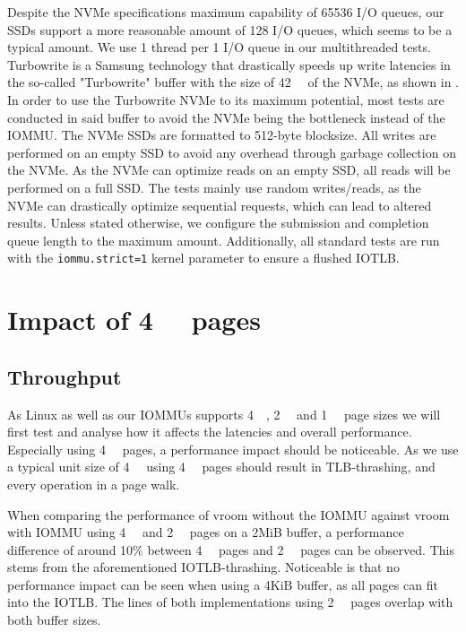 Despite the NVMe specifications maximum capability of 65536 I/O queues, our SSDs support a more reasonable amount of 128 I/O queues, which seems to be a typical amount.
We use 1 thread per 1 I/O queue in our multithreaded tests. Turbowrite is a Samsung technology that drastically speeds up write latencies in the so-called "Turbowrite" buffer with the size of \qty{42}{\giga\byte} of the NVMe, as shown in \cite{vroom}. In order to use the Turbowrite NVMe to its maximum potential, most tests are conducted in said buffer to avoid the NVMe being the bottleneck instead of the IOMMU.
The NVMe SSDs are formatted to 512-byte blocksize. All writes are performed on an empty SSD to avoid any overhead through garbage collection on the NVMe. As the NVMe can optimize reads on an empty SSD, all reads will be performed on a full SSD. The tests mainly use random writes/reads, as the NVMe can drastically optimize sequential requests, which can lead to altered results.
Unless stated otherwise, we configure the submission and completion queue length to the maximum amount.
Additionally, all standard tests are run with the \texttt{iommu.strict=1} kernel parameter to ensure a flushed IOTLB.

\section{Impact of \qty{4}{\kibi\byte} pages}
\subsection{Throughput}
As Linux as well as our IOMMUs supports \qty{4}{\kibi\byte}, \qty{2}{\mebi\byte} and \qty{1}{\gibi\byte} page sizes we will first test and analyse how it affects the latencies and overall performance. Especially using \qty{4}{\kibi\byte} pages, a performance impact should be noticeable. As we use a typical unit size of \qty{4}{\kibi\byte} using \qty{4}{\kibi\byte} pages should result in TLB-thrashing, and every operation in a page walk.

When comparing the performance of vroom without the IOMMU against vroom with IOMMU using \qty{4}{\kibi\byte} and \qty{2}{\mebi\byte} pages on a 2MiB buffer, a performance difference of around 10\% between \qty{4}{\kibi\byte} pages and \qty{2}{\mebi\byte} pages can be observed. This stems from the aforementioned IOTLB-thrashing. Noticeable is that no performance impact can be seen when using a 4KiB buffer, as all pages can fit into the IOTLB. The lines of both implementations using \qty{2}{\mebi\byte} pages overlap with both buffer sizes.

